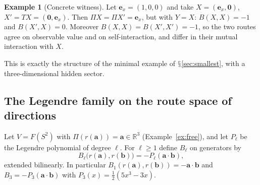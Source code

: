 \documentclass[11pt,a4paper]{article}
\renewcommand{\S}{\ensuremath{\mathsection}}
\newcommand{\RR}{\mathbb{R}}
\theoremstyle{plain}
\theoremstyle{definition}
\newtheorem{example}[theorem]{Example}
\begin{document}
\begin{example}[Concrete witness]\label{ex:witness}
Let $\mathbf e_x=(1,0,0)$ and take $X=(\mathbf e_x,\mathbf 0)$, $X'=TX=(\mathbf 0,\mathbf e_x)$. Then $\Pi X=\Pi X'=\mathbf e_x$, but with $Y=X$: $B(X,X)=-1$ and $B(X',X)=0$.
Moreover $B(X,X)=B(X',X')=-1$, so the two routes agree on observable value and on self-interaction, and differ in their mutual interaction with $X$.
\end{example}
This is exactly the structure of the minimal example of \S\ref{sec:smallest}, with a three-dimensional hidden sector.

\subsection{The Legendre family on the route space of directions}\label{sec:legendre}
Let $V=F(S^2)$ with $\Pi(r(\mathbf a))=\mathbf a\in\RR^3$ (Example~\ref{ex:free}), and let $P_\ell$ be the Legendre polynomial of degree $\ell$. For $\ell\ge1$ define $B_\ell$ on generators by
\begin{equation}\label{eq:Bell}
B_\ell\bigl(r(\mathbf a),r(\mathbf b)\bigr)=-P_\ell(\mathbf a\cdot\mathbf b),
\end{equation}
extended bilinearly. In particular $B_1(r(\mathbf a),r(\mathbf b))=-\mathbf a\cdot\mathbf b$ and $B_3=-P_3(\mathbf a\cdot\mathbf b)$ with $P_3(x)=\tfrac12(5x^3-3x)$.
\end{document}
